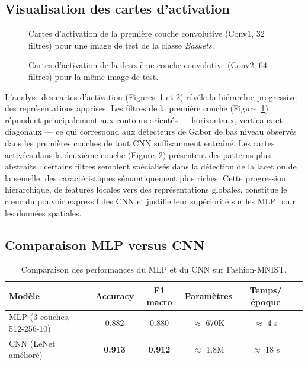 \documentclass[11pt,a4paper]{article}
\begin{document}
\subsection{Visualisation des cartes d'activation}

\begin{figure}[H]
  \centering
  \caption{Cartes d'activation de la première couche convolutive (Conv1, 32 filtres)
           pour une image de test de la classe \textit{Baskets}.}
  \label{fig:feature_maps_conv1}
\end{figure}

\begin{figure}[H]
  \centering
  \caption{Cartes d'activation de la deuxième couche convolutive (Conv2, 64 filtres)
           pour la même image de test.}
  \label{fig:feature_maps_conv2}
\end{figure}

L'analyse des cartes d'activation (Figures~\ref{fig:feature_maps_conv1} et
\ref{fig:feature_maps_conv2}) révèle la hiérarchie progressive des représentations
apprises. Les filtres de la première couche (Figure~\ref{fig:feature_maps_conv1})
répondent principalement aux contours orientés — horizontaux, verticaux et diagonaux
— ce qui correspond aux détecteurs de Gabor de bas niveau observés dans les premières
couches de tout CNN suffisamment entraîné. Les cartes activées dans la deuxième couche
(Figure~\ref{fig:feature_maps_conv2}) présentent des patterns plus abstraits : certains
filtres semblent spécialisés dans la détection de la lacet ou de la semelle, des
caractéristiques sémantiquement plus riches. Cette progression hiérarchique, de
features locales vers des représentations globales, constitue le cœur du pouvoir
expressif des CNN et justifie leur supériorité sur les MLP pour les données spatiales.

\subsection{Comparaison MLP versus CNN}

\begin{table}[H]
  \centering
  \caption{Comparaison des performances du MLP et du CNN sur Fashion-MNIST.}
  \label{tab:mlp_vs_cnn}
  \begin{tabular}{lccccc}
    \toprule
    \textbf{Modèle} & \textbf{Accuracy} & \textbf{F1 macro} & \textbf{Paramètres} & \textbf{Temps/époque} \\
    \midrule
    MLP (3 couches, 512-256-10) & 0.882 & 0.880 & $\approx$ 670K & $\approx$ 4 s \\
    CNN (LeNet amélioré)        & \textbf{0.913} & \textbf{0.912} & $\approx$ 1.8M & $\approx$ 18 s \\
    \bottomrule
  \end{tabular}
\end{table}
\end{document}
